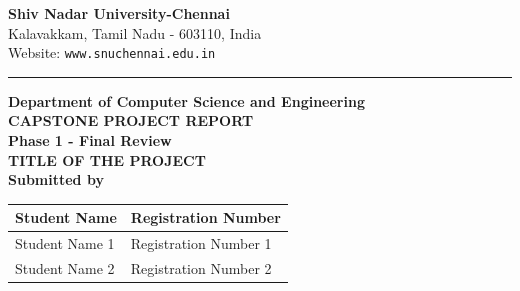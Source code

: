 \documentclass[12pt,a4paper]{report}
\begin{document}

\begin{titlepage}




\centering
{\large \textbf{Shiv Nadar University-Chennai}}\\[0.1cm]
{\normalsize Kalavakkam, Tamil Nadu - 603110, India}\\[0.1cm]
{\normalsize Website: \texttt{www.snuchennai.edu.in}}


\vspace{0.2cm}
\hrule

\begin{center}

{\large \textbf{Department of Computer Science and Engineering }}\\[1cm]

{\large \textbf{CAPSTONE PROJECT REPORT}}\\

{\large \textbf{Phase 1 - Final Review}}\\[1cm]


{\large \textbf{TITLE OF THE PROJECT}}\\[1cm]

{\large \textbf{Submitted by}}\\[0.3cm]

\begin{tabular}{p{6cm}p{5cm}}
\toprule
\centering \textbf{Student Name} &
\centering \arraybackslash \textbf{Registration Number}\\
\midrule
\centering Student Name 1 &
\centering \arraybackslash Registration Number 1\\
\centering Student Name 2 &
\centering \arraybackslash Registration Number 2\\
\bottomrule
\end{tabular}


\end{center}
\end{titlepage}
\end{document}
